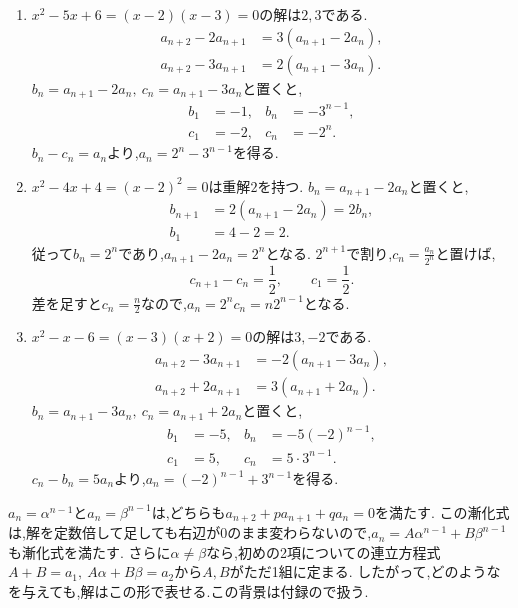 \noindent{}\par\nobreak
\begin{enumerate}[label=(\arabic*),parsep=3pt,format=\bookitemlink{example-three-term-1}{solution}{problem}]
  \item {}$x^2-5x+6=(x-2)(x-3)=0$の解は$2,3$である.
    \begin{align*}
      a_{n+2}-2a_{n+1}&=3(a_{n+1}-2a_n),\\
      a_{n+2}-3a_{n+1}&=2(a_{n+1}-3a_n).
    \end{align*}
    $b_n=a_{n+1}-2a_n,\ c_n=a_{n+1}-3a_n$と置くと,
    \[
      \begin{aligned}
        b_1&=-1,& b_n&=-3^{n-1},\\
        c_1&=-2,& c_n&=-2^n.
      \end{aligned}
    \]
    $b_n-c_n=a_n$より,$a_n=2^n-3^{n-1}$を得る.
  \item {}$x^2-4x+4=(x-2)^2=0$は重解$2$を持つ.
    $b_n=a_{n+1}-2a_n$と置くと,
    \[
      \begin{aligned}
        b_{n+1}&=2(a_{n+1}-2a_n)=2b_n,\\
        b_1&=4-2=2.
      \end{aligned}
    \]
    従って$b_n=2^n$であり,$a_{n+1}-2a_n=2^n$となる.
    $2^{n+1}$で割り,$c_n=\frac{a_n}{2^n}$と置けば,
    \[
      c_{n+1}-c_n=\frac12,\qquad c_1=\frac12.
    \]
    差を足すと$c_n=\frac{n}{2}$なので,$a_n=2^nc_n=n2^{n-1}$となる.
  \item {}$x^2-x-6=(x-3)(x+2)=0$の解は$3,-2$である.
    \begin{align*}
      a_{n+2}-3a_{n+1}&=-2(a_{n+1}-3a_n),\\
      a_{n+2}+2a_{n+1}&=3(a_{n+1}+2a_n).
    \end{align*}
    $b_n=a_{n+1}-3a_n,\ c_n=a_{n+1}+2a_n$と置くと,
    \[
      \begin{aligned}
        b_1&=-5,& b_n&=-5(-2)^{n-1},\\
        c_1&=5,& c_n&=5\cdot3^{n-1}.
      \end{aligned}
    \]
    $c_n-b_n=5a_n$より,$a_n=(-2)^{n-1}+3^{n-1}$を得る.
\end{enumerate}

\label{解釈：2つの解の和で表せる理由}
$a_n=\alpha^{n-1}$と$a_n=\beta^{n-1}$は,どちらも$a_{n+2}+pa_{n+1}+qa_n=0$を満たす.
この漸化式は,解を定数倍して足しても右辺が0のまま変わらないので,$a_n=A\alpha^{n-1}+B\beta^{n-1}$も漸化式を満たす.
さらに$\alpha\ne\beta$なら,初めの2項についての連立方程式$A+B=a_1,\ A\alpha+B\beta=a_2$から$A,B$がただ1組に定まる.
したがって,どのようなを与えても,解はこの形で表せる.この背景は付録ので扱う.

